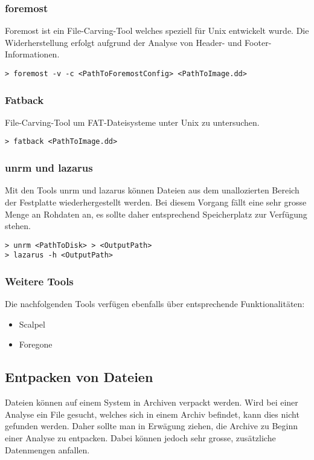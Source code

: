 \subsubsection{foremost}
Foremost ist ein File-Carving-Tool welches speziell für Unix entwickelt wurde. Die Widerherstellung erfolgt aufgrund der Analyse von Header- und Footer-Informationen.

\begin{lstlisting}
> foremost -v -c <PathToForemostConfig> <PathToImage.dd>
\end{lstlisting}


\subsubsection{Fatback}
File-Carving-Tool um FAT-Dateisysteme unter Unix zu untersuchen.

\begin{lstlisting}
> fatback <PathToImage.dd>
\end{lstlisting}


\subsubsection{unrm und lazarus}
Mit den Tools unrm und lazarus können Dateien aus dem unallozierten Bereich der Festplatte wiederhergestellt werden. Bei diesem Vorgang fällt eine sehr grosse Menge an Rohdaten an, es sollte daher entsprechend Speicherplatz zur Verfügung stehen.
\begin{lstlisting}
> unrm <PathToDisk> > <OutputPath>
> lazarus -h <OutputPath>
\end{lstlisting}


\subsubsection{Weitere Tools} 
Die nachfolgenden Tools verfügen ebenfalls über entsprechende Funktionalitäten:
\begin{itemize}
\item Scalpel
\item Foregone
\end{itemize}

\subsection{Entpacken von Dateien}
Dateien können auf einem System in Archiven verpackt werden. Wird bei einer Analyse ein File gesucht, welches sich in einem Archiv befindet, kann dies nicht gefunden werden. Daher sollte man in Erwägung ziehen, die Archive zu Beginn einer Analyse zu entpacken. Dabei können jedoch sehr grosse, zusätzliche Datenmengen anfallen.

